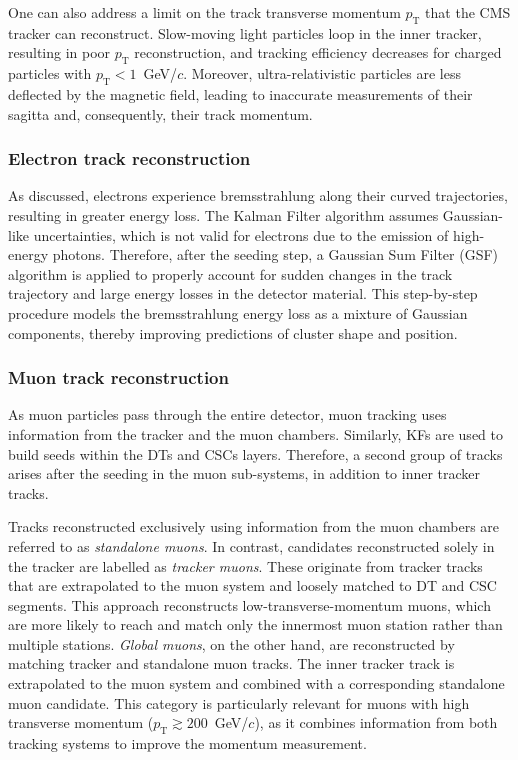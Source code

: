 One can also address a limit on the track transverse momentum $p_{\mathrm{T}}$ that the CMS tracker can reconstruct. Slow-moving light particles loop in the inner tracker, resulting in poor $p_{\mathrm{T}}$ reconstruction, and tracking efficiency decreases for charged particles with $p_{\mathrm{T}}<1$~GeV/$c$. Moreover, ultra-relativistic particles are less deflected by the magnetic field, leading to inaccurate measurements of their sagitta and, consequently, their track momentum.

\subsubsection{Electron track reconstruction}

As discussed, electrons experience bremsstrahlung along their curved trajectories, resulting in greater energy loss. The Kalman Filter algorithm assumes Gaussian-like uncertainties, which is not valid for electrons due to the emission of high-energy photons. Therefore, after the seeding step, a Gaussian Sum Filter (GSF) algorithm is applied to properly account for sudden changes in the track trajectory and large energy losses in the detector material. This step-by-step procedure models the bremsstrahlung energy loss as a mixture of Gaussian components, thereby improving predictions of cluster shape and position.

\subsubsection{Muon track reconstruction}
\label{subsubsection:muon_track}

As muon particles pass through the entire detector, muon tracking uses information from the tracker and the muon chambers. Similarly, KFs are used to build seeds within the DTs and CSCs layers. Therefore, a second group of tracks arises after the seeding in the muon sub-systems, in addition to inner tracker tracks.

Tracks reconstructed exclusively using information from the muon chambers are referred to as \textit{standalone muons}. In contrast, candidates reconstructed solely in the tracker are labelled as \textit{tracker muons}. These originate from tracker tracks that are extrapolated to the muon system and loosely matched to DT and CSC segments. This approach reconstructs low-transverse-momentum muons, which are more likely to reach and match only the innermost muon station rather than multiple stations. \textit{Global muons}, on the other hand, are reconstructed by matching tracker and standalone muon tracks. The inner tracker track is extrapolated to the muon system and combined with a corresponding standalone muon candidate. This category is particularly relevant for muons with high transverse momentum ($p_{\mathrm{T}}\gtrsim200$~GeV/$c$), as it combines information from both tracking systems to improve the momentum measurement.

